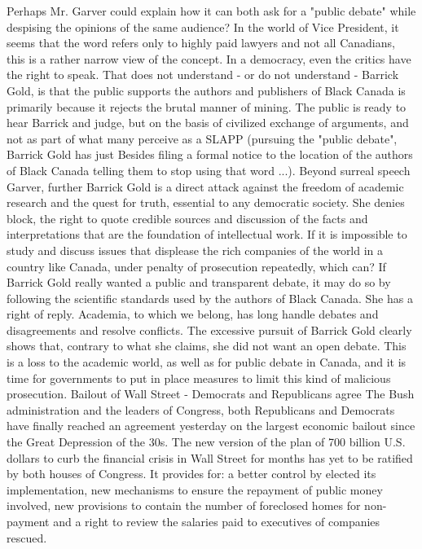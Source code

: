 Perhaps Mr. Garver could explain how it can both ask for a "public debate" while despising the opinions of the same audience?
In the world of Vice President, it seems that the word refers only to highly paid lawyers and not all Canadians, this is a rather narrow view of the concept.
In a democracy, even the critics have the right to speak.
That does not understand - or do not understand - Barrick Gold, is that the public supports the authors and publishers of Black Canada is primarily because it rejects the brutal manner of mining.
The public is ready to hear Barrick and judge, but on the basis of civilized exchange of arguments, and not as part of what many perceive as a SLAPP (pursuing the "public debate", Barrick Gold has just Besides filing a formal notice to the location of the authors of Black Canada telling them to stop using that word ...).
Beyond surreal speech Garver, further Barrick Gold is a direct attack against the freedom of academic research and the quest for truth, essential to any democratic society.
She denies block, the right to quote credible sources and discussion of the facts and interpretations that are the foundation of intellectual work.
If it is impossible to study and discuss issues that displease the rich companies of the world in a country like Canada, under penalty of prosecution repeatedly, which can?
If Barrick Gold really wanted a public and transparent debate, it may do so by following the scientific standards used by the authors of Black Canada.
She has a right of reply.
Academia, to which we belong, has long handle debates and disagreements and resolve conflicts.
The excessive pursuit of Barrick Gold clearly shows that, contrary to what she claims, she did not want an open debate.
This is a loss to the academic world, as well as for public debate in Canada, and it is time for governments to put in place measures to limit this kind of malicious prosecution.
Bailout of Wall Street - Democrats and Republicans agree
The Bush administration and the leaders of Congress, both Republicans and Democrats have finally reached an agreement yesterday on the largest economic bailout since the Great Depression of the 30s.
The new version of the plan of 700 billion U.S. dollars to curb the financial crisis in Wall Street for months has yet to be ratified by both houses of Congress.
It provides for: a better control by elected its implementation, new mechanisms to ensure the repayment of public money involved, new provisions to contain the number of foreclosed homes for non-payment and a right to review the salaries paid to executives of companies rescued.
